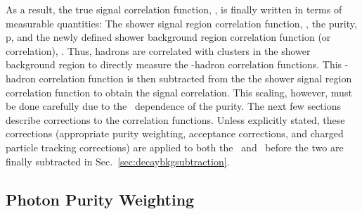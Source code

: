 As a result, the true signal correlation function, \CS, is finally written in terms of measurable quantities: The shower signal region correlation function, \CSR, the purity, p, and the newly defined shower background region correlation function (or \ydecay correlation), \CBR. Thus, hadrons are correlated with clusters in the shower background region to directly measure the \ydecay-hadron correlation functions. This \ydecay-hadron correlation function is then subtracted from the the shower signal region correlation function to obtain the signal correlation. This scaling, however, must be done carefully due to the \pt~dependence of the purity. The next few sections describe corrections to the correlation functions. Unless explicitly stated, these corrections (appropriate purity weighting, acceptance corrections, and charged particle tracking corrections) are applied to both the \CSR~and \CBR~before the two are finally subtracted in Sec.~\ref{sec:decaybkgsubtraction}.








\subsection{Photon Purity Weighting}
\label{sec:errfit}

